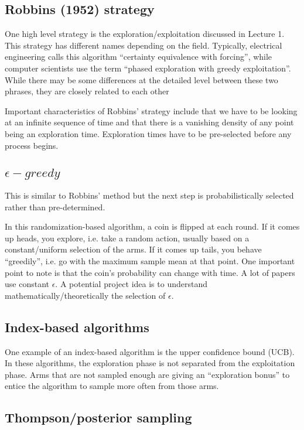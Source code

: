 \documentclass[11pt]{article}
\begin{document}
\subsection{Robbins (1952) strategy}
One high level strategy is the exploration/exploitation discussed in Lecture 1.  This strategy has different names depending on the field.  Typically, electrical engineering calls this algorithm ``certainty equivalence with forcing'', while computer scientists use the term ``phased exploration with greedy exploitation''.  While there may be some differences at the detailed level between these two phrases, they are closely related to each other

Important characteristics of Robbins' strategy include that we have to be looking at an infinite sequence of time and that there is a vanishing density of any point being an exploration time.  Exploration times have to be pre-selected before any process begins. 

\subsection{$\epsilon-greedy$}
This is similar to Robbins' method but the next step is probabilistically selected rather than pre-determined.

In this randomization-based algorithm, a coin is flipped at each round.  If it comes up heads, you explore, i.e. take a random action, usually based on a constant/uniform selection of the arms.  If it comes up tails, you behave ``greedily'', i.e. go with the maximum sample mean at that point.  One important point to note is that the coin's probability can change with time.  A lot of papers use constant $\epsilon$.  A potential project idea is to understand mathematically/theoretically the selection of $\epsilon$.  

\subsection{Index-based algorithms}
One example of an index-based algorithm is the upper confidence bound (UCB).  In these algorithms, the exploration phase is not separated from the exploitation phase.  Arms that are not sampled enough are giving an ``exploration bonus'' to entice the algorithm to sample more often from those arms.

\subsection{Thompson/posterior sampling}
\end{document}
